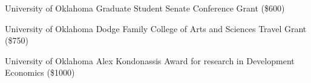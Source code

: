 {%
	University of Oklahoma}
{%
	Graduate Student Senate Conference Grant (\$600)}
{}

{%
	University of Oklahoma}
{%
	Dodge Family College of Arts and Sciences Travel Grant (\$750)}
{}

{%
	University of Oklahoma}
{%
	Alex Kondonassis Award for research in Development \\ Economics (\$1000)}
{}
